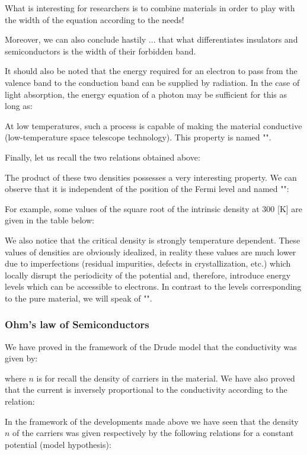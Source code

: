 	What is interesting for researchers is to combine materials in order to play with the width of the equation according to the needs!

	Moreover, we can also conclude hastily ... that what differentiates insulators and semiconductors is the width of their forbidden band.

	It should also be noted that the energy required for an electron to pass from the valence band to the conduction band can be supplied by radiation. In the case of light absorption, the energy equation of a photon may be sufficient for this as long as:
	
	At low temperatures, such a process is capable of making the material conductive (low-temperature space telescope technology). This property is named "".

	Finally, let us recall the two relations obtained above:
	
	The product of these two densities possesses a very interesting property. We can observe that it is independent of the position of the Fermi level and named "":
	
	For example, some values of the square root of the intrinsic density at $300$ [K] are given in the table below:
	
	We also notice that the critical density is strongly temperature dependent. These values of densities are obviously idealized, in reality these values are much lower due to imperfections (residual impurities, defects in crystallization, etc.) which locally disrupt the periodicity of the potential and, therefore, introduce energy levels which can be accessible to electrons. In contrast to the levels corresponding to the pure material, we will speak of "".
	
	\subsubsection{Ohm's law of Semiconductors}
	We have proved in the framework of the Drude model that the conductivity was given by:
	
	where $n$ is for recall the density of carriers in the material. We have also proved that the current is inversely proportional to the conductivity according to the relation:
	
	In the framework of the developments made above we have seen that the density $n$ of the carriers was given respectively by the following relations for a constant potential (model hypothesis):
	
